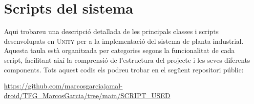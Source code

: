 \documentclass[a4paper,11pt,DIV=13,headings=normal,abstract=true,twoside=semi]{article}
\newcommand{\acro}[1]{\textsc{#1}}
\begin{document}
\section{Scripts del sistema}
\label{sec:scripts_unity}

Aqui trobareu una descripció detallada de les principals classes i scripts desenvolupats en \acro{Unity} per a la implementació del sistema de planta industrial. Aquesta taula està organitzada per categories segons la funcionalitat de cada script, facilitant així la comprensió de l'estructura del projecte i les seves diferents components. Tots aquest codis els podreu trobar en el següent repositori públic: 

\begin{center}
\href{https://github.com/marcosgarciajamal-droid/TFG_MarcosGarcia/tree/main/SCRIPT_USED}{https://github.com/marcosgarciajamal-droid/TFG\_MarcosGarcia/tree/main/SCRIPT\_USED}
\end{center}
\end{document}

